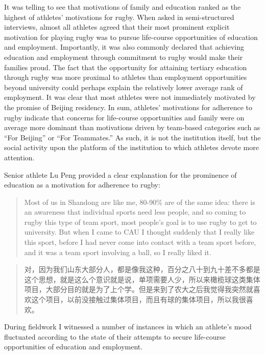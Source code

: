 \begin{CJK}{UTF8}{gbsn}
It was telling to see that motivations of family and education ranked as the highest of athletes' motivations for rugby.  When asked in semi-structured interviews, almost all athletes agreed that their most prominent explicit motivation for playing rugby was to pursue life-course opportunities of education and employment.  Importantly, it was also commonly declared that achieving education and employment through commitment to rugby would make their families proud.  The fact that the opportunity for attaining tertiary education through rugby was more proximal to athletes than employment opportunities beyond university could perhaps explain the relatively lower average rank of employment. It was clear that most athletes were not immediately motivated by the promise of Beijing residency.  In sum, athletes' motivations for adherence to rugby indicate that concerns for life-course opportunities and family were on average more dominant than motivations driven by team-based categories such as ``For Beijing'' or ``For Teammates.''  As such, it is not the institution itself, but the social activity upon the platform of the institution to which athletes devote more attention.

Senior athlete Lu Peng provided a clear explanation for the prominence of education as a motivation for adherence to rugby:

\begin{quotation}
  Most of us in Shandong are like me, 80-90\% are of the same idea: there is an awareness that individual sports need less people, and so coming to rugby this type of team sport, most people’s goal is to use rugby to get to university.  But when I came to CAU I thought suddenly that I really like this sport, before I had never come into contact with a team sport before, and it was a team sport involving a ball, so I really liked it.
\end{quotation}

\begin{quotation}
  对，因为我们山东大部分人，都是像我这种，百分之八十到九十差不多都是这个思想，就是这么个意识就是说，单项需要人少，所以来橄榄球这类集体项目，大部分目的就是为了上个学。但是来到了农大之后我觉得我突然就喜欢这个项目，以前没接触过集体项目，而且有球的集体项目，所以我很喜欢。
\end{quotation}


During fieldwork I witnessed a number of instances in which an athlete's mood fluctuated according to the state of their attempts to secure life-course opportunities of education and employment.


\end{CJK}
